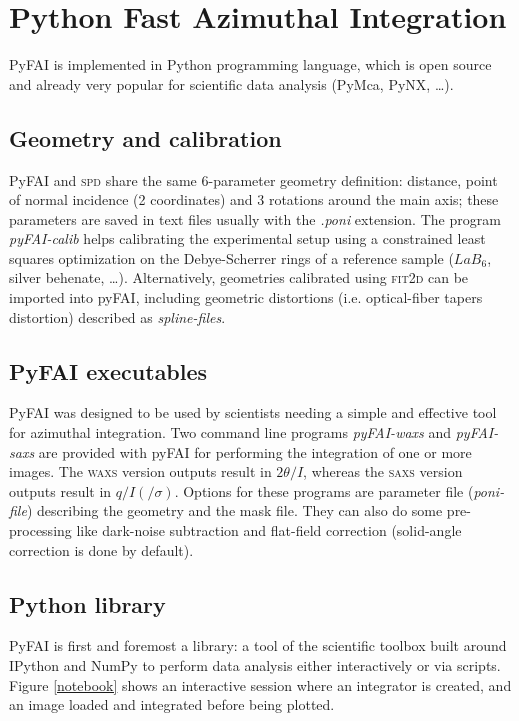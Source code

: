 \documentclass[a4paper]{jpconf}
\begin{document}
\section{Python Fast Azimuthal Integration}
PyFAI is implemented in Python programming language, which is open
source and already very popular for scientific data analysis (PyMca\cite{pymca},
PyNX\cite{pynx}, \ldots).

\subsection{Geometry and calibration}
PyFAI and \textsc{spd}\cite{spd} share the same 6-parameter geometry definition:
distance, point of normal incidence (2 coordinates) and 3 rotations around
the main axis; these parameters are saved in text files usually with the
\textit{.poni} extension. The program \textit{pyFAI-calib} helps calibrating the
experimental setup using a constrained least squares optimization on the
Debye-Scherrer rings of a reference sample ($LaB_6$, silver
behenate, \ldots). Alternatively, geometries calibrated using
\textsc{fit2d}\cite{fit2d1996} can be imported into pyFAI, including geometric
distortions (i.e. optical-fiber tapers distortion) described as
\textit{spline-files}.

\subsection{PyFAI executables}
PyFAI was designed to be used by scientists needing a simple and effective tool
for azimuthal integration. Two command line programs \textit{pyFAI-waxs} and
\textit{pyFAI-saxs} are provided with pyFAI for performing the
integration of one or more images. The \textsc{waxs} version outputs result in
$2\theta /I$,  whereas the \textsc{saxs} version outputs result in $q/I(/\sigma
)$.
Options for these programs are parameter file (\textit{poni-file}) describing
the geometry and the mask file. They can also do some pre-processing like
dark-noise subtraction and flat-field correction (solid-angle correction is done by
default).

\subsection{Python library}
PyFAI is first and foremost a library: a tool of the scientific
toolbox built around IPython\cite{ipython} and NumPy\cite{numpy} to
perform data analysis either interactively or via scripts.
Figure \ref{notebook} shows an interactive session where an integrator is
created, and an image loaded and integrated before being plotted.
\end{document}
